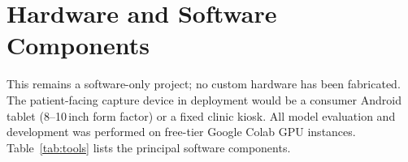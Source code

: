 \documentclass[12pt,a4paper]{article}
\begin{document}
\section{Hardware and Software Components}
\label{sec:components}

This remains a software-only project; no custom hardware has been
fabricated. The patient-facing capture device in deployment would be a
consumer Android tablet (8--10\,inch form factor) or a fixed clinic
kiosk. All model evaluation and development was performed on free-tier
Google Colab GPU instances. Table~\ref{tab:tools} lists the principal
software components.

\renewcommand{\arraystretch}{1.2}
\footnotesize
\end{document}
